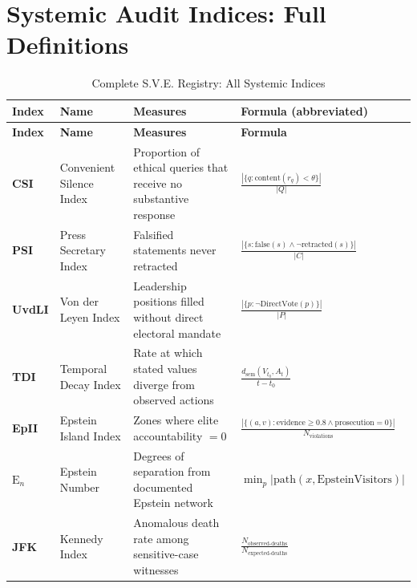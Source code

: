 \documentclass[11pt,a4paper]{article}
\theoremstyle{definition}
\theoremstyle{remark}
\begin{document}
\section{Systemic Audit Indices: Full Definitions}
\label{app:systemic}

\begin{longtable}{@{}p{}p{}
  p{}p{}@{}}
\caption{Complete S.V.E. Registry: All Systemic Indices}
\label{tab:sve-registry}\\
\toprule
\textbf{Index} & \textbf{Name} & \textbf{Measures} &
  \textbf{Formula (abbreviated)} \\
\midrule
\endfirsthead
\toprule
\textbf{Index} & \textbf{Name} & \textbf{Measures} &
  \textbf{Formula} \\
\midrule
\endhead
\bottomrule
\endlastfoot

\textbf{CSI} & Convenient Silence Index &
  Proportion of ethical queries that receive no substantive response &
  $\frac{|\{q: \text{content}(r_q) < \theta\}|}{|Q|}$ \\[4pt]

\textbf{PSI} & Press Secretary Index &
  Falsified statements never retracted &
  $\frac{|\{s: \text{false}(s) \wedge \neg\text{retracted}(s)\}|}{|C|}$ \\[4pt]

\textbf{UvdLI} & Von der Leyen Index &
  Leadership positions filled without direct electoral mandate &
  $\frac{|\{p: \neg\text{DirectVote}(p)\}|}{|P|}$ \\[4pt]

\textbf{TDI} & Temporal Decay Index &
  Rate at which stated values diverge from observed actions &
  $\frac{d_\text{sem}(V_{t_0}, A_t)}{t - t_0}$ \\[4pt]

\textbf{EpII} & Epstein Island Index &
  Zones where elite accountability $= 0$ &
  $\frac{|\{(a,v): \text{evidence} \geq 0.8 \wedge \text{prosecution} = 0\}|}{N_\text{violations}}$ \\[4pt]

\textbf{$\text{E}_n$} & Epstein Number &
  Degrees of separation from documented Epstein network &
  $\min_p |\text{path}(x, \text{EpsteinVisitors})|$ \\[4pt]

\textbf{JFK} & Kennedy Index &
  Anomalous death rate among sensitive-case witnesses &
  $\frac{N_\text{observed-deaths}}{N_\text{expected-deaths}}$ \\[4pt]


\end{longtable}
\end{document}
